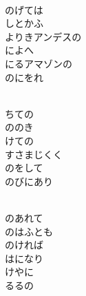 \documentclass[10pt,b5j]{tarticle} %
\begin{document}
\begin{enumerate}
\begin{minipage}[c]{\blocksize}
    \end{minipage}
    \begin{minipage}[c]{\blocksize}
        
        \vspace{\linespace}
        \item~\\
        のげては\\
        しとかふ\\
        よりきアンデスの\\
        によへ\\
        にるアマゾンの\\
        のにをれ
        
    \end{minipage}
    \begin{minipage}[c]{\blocksize}
        
        \vspace{\linespace}
        \item~\\
        ちての\\
        ののき\\
        けての\\
        すさまじくく\\
        のをして\\
        のびにあり
        
    \end{minipage}
    \begin{minipage}[c]{\blocksize}
        
        \vspace{\linespace}
        \item~\\
        のあれて\\
        のはふとも\\
        のければ\\
        はになり\\
        けやに\\
        るるの
    
    \end{minipage}
\end{enumerate} %
\end{document}
